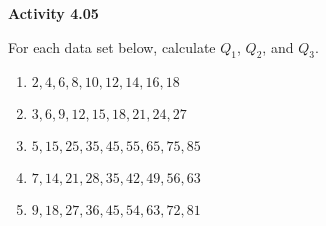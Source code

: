 \vspace{0.3ex}
\noindent\textbf{Activity 4.05}

\vspace{0.2ex}

For each data set below, calculate \(Q_1\), \(Q_2\), and \(Q_3\).  

\begin{enumerate}
    \item \(2, 4, 6, 8, 10, 12, 14, 16, 18\)  
    \item \(3, 6, 9, 12, 15, 18, 21, 24, 27\)  
    \item \(5, 15, 25, 35, 45, 55, 65, 75, 85\)  
    \item \(7, 14, 21, 28, 35, 42, 49, 56, 63\)  
    \item \(9, 18, 27, 36, 45, 54, 63, 72, 81\)  
\end{enumerate}
